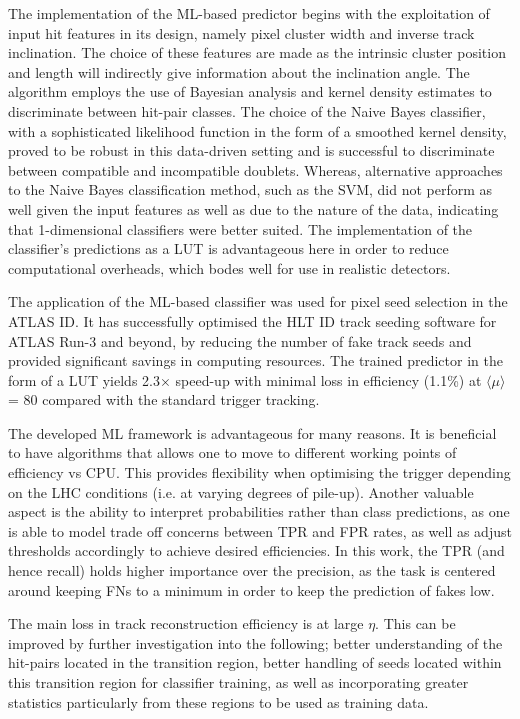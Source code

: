 The implementation of the ML-based predictor begins with the exploitation of input hit features in its design, namely pixel cluster width and inverse track inclination. The choice of these features are made as the intrinsic cluster position and length will indirectly give information about the inclination angle. The algorithm employs the use of Bayesian analysis and kernel density estimates to discriminate between hit-pair classes. The choice of the Naive Bayes classifier, with a sophisticated likelihood function in the form of a smoothed kernel density, proved to be robust in this data-driven setting and is successful to discriminate between compatible and incompatible doublets. Whereas, alternative approaches to the Naive Bayes classification method, such as the SVM, did not perform as well given the input features as well as due to the nature of the data, indicating that 1-dimensional classifiers were better suited. The implementation of the classifier’s predictions as a LUT is advantageous here in order to reduce computational overheads, which bodes well for use in realistic detectors.

The application of the ML-based classifier was used for pixel seed selection in the ATLAS ID. It has successfully optimised the HLT ID track seeding software for ATLAS Run-3 and beyond, by reducing the number of fake track seeds and provided significant savings in computing resources. The trained predictor in the form of a LUT yields 2.3$\times$ speed-up with minimal loss in efficiency (1.1\%) at $\langle \mu \rangle$ = 80 compared with the standard trigger tracking. 

The developed ML framework is advantageous for many reasons. It is beneficial to have algorithms that allows one to move to different working points of efficiency vs CPU. This provides flexibility when optimising the trigger depending on the LHC conditions (i.e. at varying degrees of pile-up). Another valuable aspect is the ability to interpret probabilities rather than class predictions, as one is able to model trade off concerns between TPR and FPR rates, as well as adjust thresholds accordingly to achieve desired efficiencies. In this work, the TPR (and hence recall) holds higher importance over the precision, as the task is centered around keeping FNs to a minimum in order to keep the prediction of fakes low.

The main loss in track reconstruction efficiency is at large $\eta$. This can be improved by further investigation into the following; better understanding of the hit-pairs located in the transition region, better handling of seeds located within this transition region for classifier training, as well as incorporating greater statistics particularly from these regions to be used as training data.




